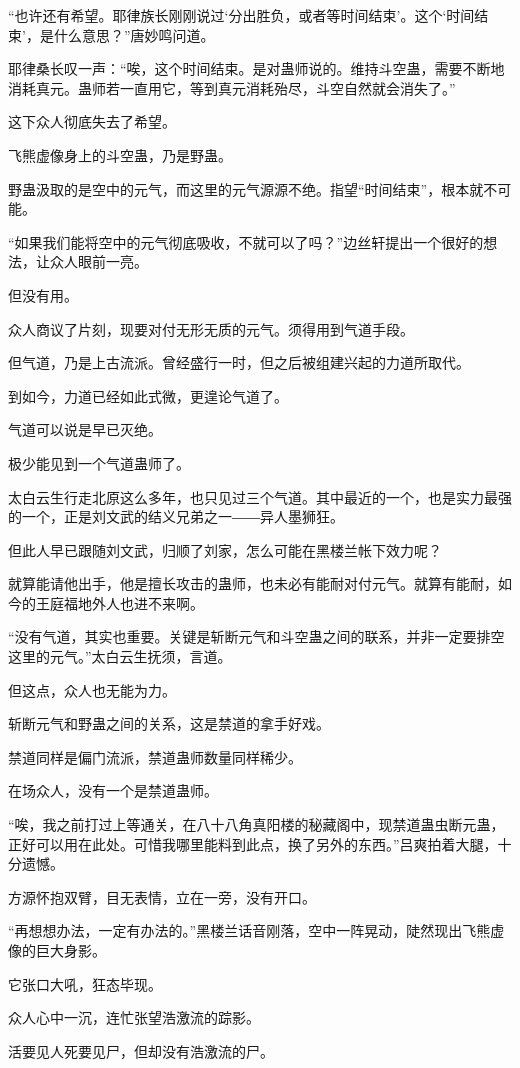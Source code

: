 \begin{this_body}
“也许还有希望。耶律族长刚刚说过‘分出胜负，或者等时间结束’。这个‘时间结束’，是什么意思？”唐妙鸣问道。

耶律桑长叹一声：“唉，这个时间结束。是对蛊师说的。维持斗空蛊，需要不断地消耗真元。蛊师若一直用它，等到真元消耗殆尽，斗空自然就会消失了。”

这下众人彻底失去了希望。

飞熊虚像身上的斗空蛊，乃是野蛊。

野蛊汲取的是空中的元气，而这里的元气源源不绝。指望“时间结束”，根本就不可能。

“如果我们能将空中的元气彻底吸收，不就可以了吗？”边丝轩提出一个很好的想法，让众人眼前一亮。

但没有用。

众人商议了片刻，现要对付无形无质的元气。须得用到气道手段。

但气道，乃是上古流派。曾经盛行一时，但之后被组建兴起的力道所取代。

到如今，力道已经如此式微，更遑论气道了。

气道可以说是早已灭绝。

极少能见到一个气道蛊师了。

太白云生行走北原这么多年，也只见过三个气道。其中最近的一个，也是实力最强的一个，正是刘文武的结义兄弟之一――异人墨狮狂。

但此人早已跟随刘文武，归顺了刘家，怎么可能在黑楼兰帐下效力呢？

就算能请他出手，他是擅长攻击的蛊师，也未必有能耐对付元气。就算有能耐，如今的王庭福地外人也进不来啊。

“没有气道，其实也重要。关键是斩断元气和斗空蛊之间的联系，并非一定要排空这里的元气。”太白云生抚须，言道。

但这点，众人也无能为力。

斩断元气和野蛊之间的关系，这是禁道的拿手好戏。

禁道同样是偏门流派，禁道蛊师数量同样稀少。

在场众人，没有一个是禁道蛊师。

“唉，我之前打过上等通关，在八十八角真阳楼的秘藏阁中，现禁道蛊虫断元蛊，正好可以用在此处。可惜我哪里能料到此点，换了另外的东西。”吕爽拍着大腿，十分遗憾。

方源怀抱双臂，目无表情，立在一旁，没有开口。

“再想想办法，一定有办法的。”黑楼兰话音刚落，空中一阵晃动，陡然现出飞熊虚像的巨大身影。

它张口大吼，狂态毕现。

众人心中一沉，连忙张望浩激流的踪影。

活要见人死要见尸，但却没有浩激流的尸。


\end{this_body}
